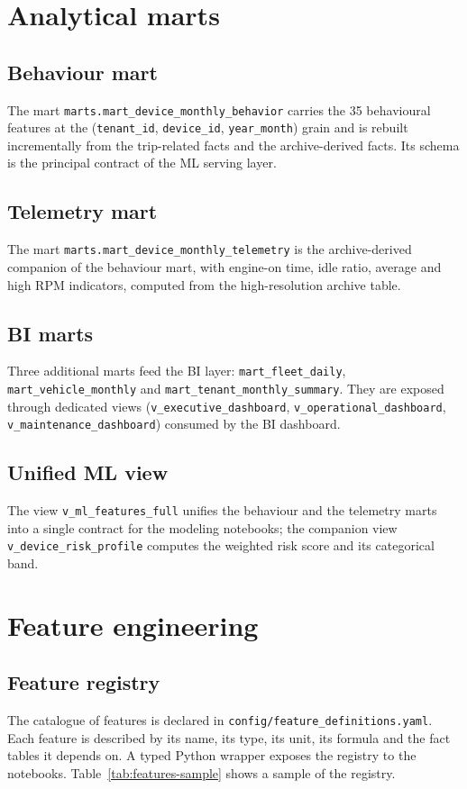 \section{Analytical marts}

\subsection{Behaviour mart}
The mart \texttt{marts.mart\_device\_monthly\_behavior} carries the 35 behavioural features at the (\texttt{tenant\_id}, \texttt{device\_id}, \texttt{year\_month}) grain and is rebuilt incrementally from the trip-related facts and the archive-derived facts. Its schema is the principal contract of the ML serving layer.

\subsection{Telemetry mart}
The mart \texttt{marts.mart\_device\_monthly\_telemetry} is the archive-derived companion of the behaviour mart, with engine-on time, idle ratio, average and high RPM indicators, computed from the high-resolution archive table.

\subsection{BI marts}
Three additional marts feed the BI layer: \texttt{mart\_fleet\_daily}, \texttt{mart\_vehicle\_monthly} and \texttt{mart\_tenant\_monthly\_summary}. They are exposed through dedicated views (\texttt{v\_executive\_dashboard}, \texttt{v\_operational\_dashboard}, \texttt{v\_maintenance\_dashboard}) consumed by the BI dashboard.

\subsection{Unified ML view}
The view \texttt{v\_ml\_features\_full} unifies the behaviour and the telemetry marts into a single contract for the modeling notebooks; the companion view \texttt{v\_device\_risk\_profile} computes the weighted risk score and its categorical band.

\section{Feature engineering}

\subsection{Feature registry}
The catalogue of features is declared in \texttt{config/feature\_definitions.yaml}. Each feature is described by its name, its type, its unit, its formula and the fact tables it depends on. A typed Python wrapper exposes the registry to the notebooks. Table~\ref{tab:features-sample} shows a sample of the registry.

